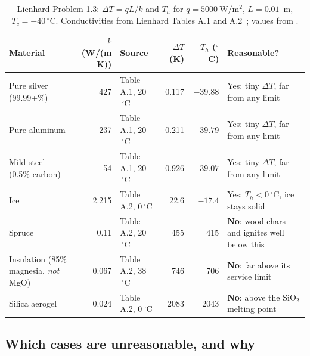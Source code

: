 \documentclass[reprint, amsmath, amssymb, aps, prl]{revtex4-2}
\newcommand{\degC}{\ensuremath{\,^\circ\mathrm{C}}}
\begin{document}
\begin{table}[t]
\caption{\label{tab:p13}Lienhard Problem 1.3: $\Delta T=qL/k$ and $T_h$ for
$q=5000~\mathrm{W/m^2}$, $L=0.01$~m, $T_c=-40\degC$. Conductivities from Lienhard
Tables A.1 and A.2~\cite{Lienhard}; values from
\pathPone.}
\begin{ruledtabular}
\begin{tabular}{lrlrrp{}}
Material & $k$ (W/(m K)) & Source & $\Delta T$ (K) & $T_h$ ($^\circ$C) & Reasonable? \\
\hline
Pure silver (99.99+\%) & 427 & Table A.1, 20\degC & 0.117 & $-39.88$ & Yes: tiny $\Delta T$, far from any limit \\
Pure aluminum & 237 & Table A.1, 20\degC & 0.211 & $-39.79$ & Yes: tiny $\Delta T$, far from any limit \\
Mild steel (0.5\% carbon) & 54 & Table A.1, 20\degC & 0.926 & $-39.07$ & Yes: tiny $\Delta T$, far from any limit \\
Ice & 2.215 & Table A.2, 0\degC & 22.6 & $-17.4$ & Yes: $T_h<0\degC$, ice stays solid \\
Spruce & 0.11 & Table A.2, 20\degC & 455 & 415 & \textbf{No}: wood chars and ignites well below this \\
Insulation (85\% magnesia, \emph{not} MgO) & 0.067 & Table A.2, 38\degC & 746 & 706 & \textbf{No}: far above its service limit \\
Silica aerogel & 0.024 & Table A.2, 0\degC & 2083 & 2043 & \textbf{No}: above the $\mathrm{SiO_2}$ melting point \\
\end{tabular}
\end{ruledtabular}
\end{table}

\subsection*{Which cases are unreasonable, and why}
\end{document}
